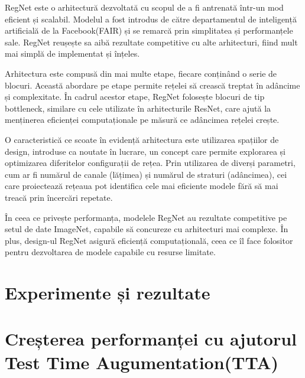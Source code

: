RegNet este o arhitectură dezvoltată cu scopul de a fi antrenată într-un mod eficient și scalabil. Modelul a fost introdus de către departamentul de inteligență artificială de la Facebook(FAIR)\cite{radosavovic2020designing} și se remarcă prin simplitatea și performanțele sale. RegNet reușește sa aibă rezultate competitive cu alte arhitecturi, fiind mult mai simplă de implementat și înțeles. 

Arhitectura este compusă din mai multe etape, fiecare conținând o serie de blocuri. Această abordare pe etape permite rețelei să crească treptat în adâncime și complexitate. În cadrul acestor etape, RegNet folosește blocuri de tip bottleneck, similare cu cele utilizate în arhitecturile ResNet, care ajută la menținerea eficienței computaționale pe măsură ce adâncimea rețelei crește.


O caracteristică ce scoate în evidență arhitectura este utilizarea spațiilor de design, introduse ca noutate în lucrare, un concept care permite explorarea și optimizarea diferitelor configurații de rețea. Prin utilizarea de diverși parametri, cum ar fi numărul de canale (lățimea) și numărul de straturi (adâncimea), cei care proiectează rețeaua pot identifica cele mai eficiente modele fără să mai treacă prin încercări repetate.

În ceea ce privește performanța, modelele RegNet au rezultate competitive pe setul de date ImageNet, capabile să concureze cu arhitecturi mai complexe. În plus, design-ul RegNet asigură eficiență computațională, ceea ce îl face folositor pentru dezvoltarea de modele capabile cu resurse limitate.



\section{Experimente și rezultate}
\label{SubCh: experimente și rezultate}
\section{Creșterea performanței cu ajutorul Test Time Augumentation(TTA)}
